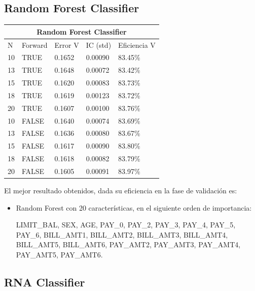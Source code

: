 \documentclass[conference]{IEEEtran}
\begin{document}
\subsection{Random Forest Classifier}\hfill
\begin{table}[h]
\centering
\begin{tabular}{lllll}
\hline
\multicolumn{5}{c}{\textbf{Random Forest Classifier}} \\ \hline
N & Forward & Error V & IC (std) & Eficiencia V \\ \hline
10 & TRUE & 0.1652 & 0.00090 & 83.45\% \\
13 & TRUE & 0.1648 & 0.00072 & 83.42\% \\
15 & TRUE & 0.1620 & 0.00083 & 83.73\% \\
18 & TRUE & 0.1619 & 0.00123 & 83.72\% \\
20 & TRUE & 0.1607 & 0.00100 & 83.76\% \\
10 & FALSE & 0.1640 & 0.00074 & 83.69\% \\
13 & FALSE & 0.1636 & 0.00080 & 83.67\% \\
15 & FALSE & 0.1617 & 0.00090 & 83.80\% \\
18 & FALSE & 0.1618 & 0.00082 & 83.79\% \\
20 & FALSE & 0.1605 & 0.00091 & 83.97\% \\ \hline
\end{tabular}
\end{table}\hfill
\newline
\newline
El mejor resultado obtenidos, dada su eficiencia en la fase de validación es:
\begin{itemize}
\item Random Forest con 20 características, en el siguiente orden de importancia:

LIMIT\_BAL, SEX, AGE, PAY\_0, PAY\_2, PAY\_3, PAY\_4, PAY\_5, PAY\_6, BILL\_AMT1, BILL\_AMT2, BILL\_AMT3, BILL\_AMT4, BILL\_AMT5, BILL\_AMT6, PAY\_AMT2, PAY\_AMT3, PAY\_AMT4, PAY\_AMT5, PAY\_AMT6.

\end{itemize}

\subsection{RNA Classifier}\hfill
\end{document}
